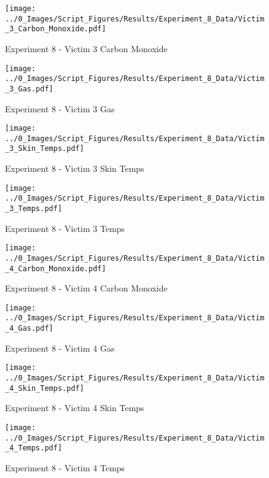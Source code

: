 	\clearpage

	\begin{figure}[H]
		\centering
		\texttt{[image: ../0\_Images/Script\_Figures/Results/Experiment\_8\_Data/Victim\_3\_Carbon\_Monoxide.pdf]}
		\caption[]{Experiment 8 - Victim 3 Carbon Monoxide}
	\end{figure}
 

	\begin{figure}[H]
		\centering
		\texttt{[image: ../0\_Images/Script\_Figures/Results/Experiment\_8\_Data/Victim\_3\_Gas.pdf]}
		\caption[]{Experiment 8 - Victim 3 Gas}
	\end{figure}
 
	\clearpage

	\begin{figure}[H]
		\centering
		\texttt{[image: ../0\_Images/Script\_Figures/Results/Experiment\_8\_Data/Victim\_3\_Skin\_Temps.pdf]}
		\caption[]{Experiment 8 - Victim 3 Skin Temps}
	\end{figure}
 

	\begin{figure}[H]
		\centering
		\texttt{[image: ../0\_Images/Script\_Figures/Results/Experiment\_8\_Data/Victim\_3\_Temps.pdf]}
		\caption[]{Experiment 8 - Victim 3 Temps}
	\end{figure}
 
	\clearpage

	\begin{figure}[H]
		\centering
		\texttt{[image: ../0\_Images/Script\_Figures/Results/Experiment\_8\_Data/Victim\_4\_Carbon\_Monoxide.pdf]}
		\caption[]{Experiment 8 - Victim 4 Carbon Monoxide}
	\end{figure}
 

	\begin{figure}[H]
		\centering
		\texttt{[image: ../0\_Images/Script\_Figures/Results/Experiment\_8\_Data/Victim\_4\_Gas.pdf]}
		\caption[]{Experiment 8 - Victim 4 Gas}
	\end{figure}
 
	\clearpage

	\begin{figure}[H]
		\centering
		\texttt{[image: ../0\_Images/Script\_Figures/Results/Experiment\_8\_Data/Victim\_4\_Skin\_Temps.pdf]}
		\caption[]{Experiment 8 - Victim 4 Skin Temps}
	\end{figure}
 

	\begin{figure}[H]
		\centering
		\texttt{[image: ../0\_Images/Script\_Figures/Results/Experiment\_8\_Data/Victim\_4\_Temps.pdf]}
		\caption[]{Experiment 8 - Victim 4 Temps}
	\end{figure}
 
